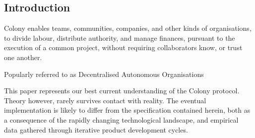 \subsection*{Introduction}
Colony enables teams, communities, companies, and other kinds of organisations, to divide labour, distribute authority, and manage finances, pursuant to the execution of a common project, without requiring collaborators know, or trust one another.

Popularly referred to as Decentralised Autonomous Organisations

This paper represents our best current understanding of the Colony protocol. Theory however, rarely survives contact with reality. The eventual implementation is likely to differ from the specification contained herein, both as a consequence of the rapidly changing technological landscape, and empirical data gathered through iterative product development cycles.




